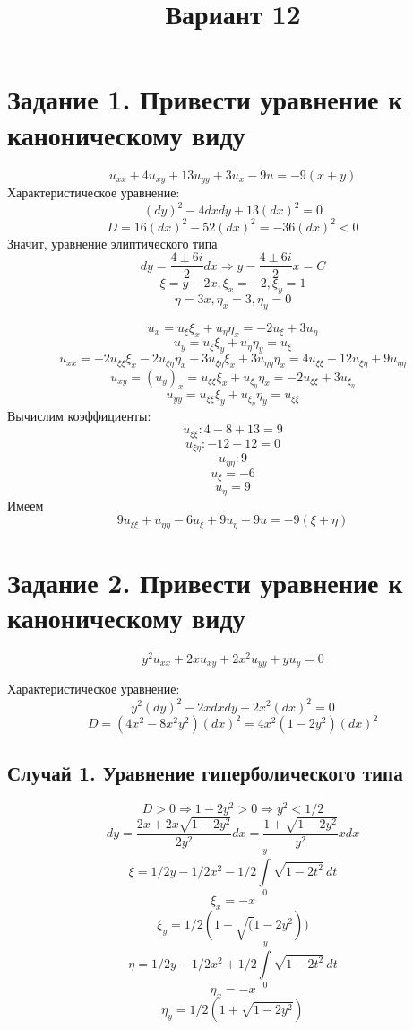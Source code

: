 \documentclass[12pt]{article}
\begin{document}
\title{Вариант 12}
\date{}
\maketitle
\section{Задание 1. Привести уравнение к каноническому виду}
$$u_{xx} + 4u_{xy} + 13u_{yy} + 3u_x - 9u = -9(x+y)$$
Характеристическое уравнение:
$$(dy)^2 - 4dxdy + 13(dx)^2 = 0$$
$$D = 16(dx)^2 - 52(dx)^2 = -36(dx)^2 < 0$$
Значит, уравнение элиптического типа
$$dy = \frac{4 \pm 6i}{2}dx \Rightarrow y - \frac{4 \pm 6i}{2}x = C$$
$$\xi = y - 2x, \xi_x = -2, \xi_y = 1$$
$$\eta = 3x, \eta_x = 3, \eta_y = 0$$

$$u_x = u_{\xi}\xi_x + u_{\eta}\eta_x = -2u_{\xi} + 3u_{\eta}$$
$$u_y = u_{\xi}\xi_y + u_{\eta}\eta_y = u_{\xi}$$
$$u_{xx} = -2u_{\xi\xi}\xi_x - 2u_{\xi\eta}\eta_x + 3u_{\xi\eta}\xi_x + 3u_{\eta\eta}\eta_x 
= 4u_{\xi\xi} - 12u_{\xi\eta}+9u_{\eta\eta}$$
$$u_{xy} = (u_y)_x = u_{\xi\xi}\xi_x + u_{\xi_\eta}\eta_x
= -2u_{\xi\xi} + 3u_{\xi_\eta}$$
$$u_{yy} = u_{\xi\xi}\xi_y + u_{\xi_\eta}\eta_y 
= u_{\xi\xi}$$
Вычислим коэффициенты:
$$u_{\xi\xi}: 4 - 8 + 13 = 9$$
$$u_{\xi\eta}: -12 + 12 = 0$$
$$u_{\eta\eta}: 9$$
$$u_{\xi} = -6$$
$$u_{\eta} = 9$$
Имеем
$$9u_{\xi\xi} + u_{\eta\eta} - 6u_{\xi} +9u_{\eta} - 9u = -9(\xi+\eta)$$
$$$$

\section{Задание 2. Привести уравнение к каноническому виду}
$$y^2u_{xx}+2xu_{xy} + 2x^2u_{yy} + yu_y = 0$$

Характеристическое уравнение:
$$y^2(dy)^2 - 2xdxdy + 2x^2(dx)^2 = 0$$
$$D = (4x^2 - 8x^2y^2)(dx)^2 = 4x^2(1 - 2y^2)(dx)^2$$

\subsection{Случай 1. Уравнение гиперболического типа} 

$$D > 0 \Rightarrow 1 - 2y^2 > 0 \Rightarrow y^2 < 1/2$$
$$dy = \frac{2x + 2x\sqrt{1-2y^2}}{2y^2}dx = \frac{1+\sqrt{1-2y^2}}{y^2}xdx$$
$$\xi = 1/2y - 1/2x^2 - 1/2 \int\limits_{0}^{y} \sqrt{1-2t^2} \,dt$$
$$\xi_x = -x$$ 
$$\xi_y = 1/2(1 - \sqrt(1-2y^2))$$
$$\eta = 1/2y - 1/2x^2 + 1/2 \int\limits_{0}^{y} \sqrt{1-2t^2} \,dt$$
$$\eta_x = -x$$ 
$$\eta_y = 1/2(1 + \sqrt{1-2y^2})$$
\end{document}
